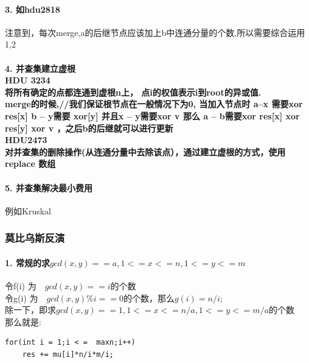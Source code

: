 \documentclass{article}
\begin{document}
\paragraph{3. 如hdu2818\\}
注意到，每次merge,a的后继节点应该加上b中连通分量的个数,所以需要综合运用1,2 \\

\paragraph{4. 并查集建立虚根\\
HDU 3234\\
将所有确定的点都连通到虚根n上， 点i的权值表示i到root的异或值. \\ merge的时候,//我们保证根节点在一般情况下为0, 当加入节点时 a--x 需要xor res[x]  b -- y需要 xor[y] 并且x -- y需要xor v 那么 a -- b需要xor res[x] xor res[y] xor v ，之后b的后继就可以进行更新\\
HDU2473 \\
对并查集的删除操作(从连通分量中去除该点），通过建立虚根的方式，使用replace 数组 \\ }

\paragraph{5. 并查集解决最小费用\\}
例如Kruskal	

\subsubsection{莫比乌斯反演}
\paragraph{1. 常规的求$gcd(x,y) == a, 1 <= x <= n,1 <= y <= m $\\}
令f(i) 为　$gcd(x,y) == i$的个数\\
令g(i) 为　$gcd(x,y) \% i == 0$的个数，那么$g(i) = n/i$; \\
除一下，即求$gcd(x,y) == 1, 1<= x <= n/a, 1 <= y <= m/a$的个数\\
那么就是:\\
\begin{lstlisting}
for(int i = 1;i < =  maxn;i++) 
	res += mu[i]*n/i*m/i; 
\end{lstlisting}
\end{document}
